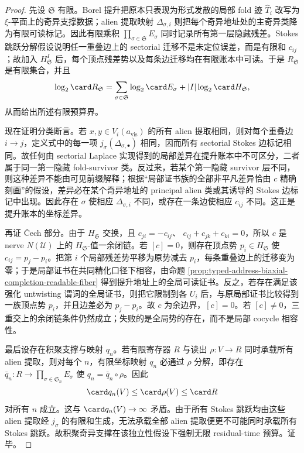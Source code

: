 \begin{proof}
先设 \(\mathfrak S\) 有限。Borel 提升把原本只表现为形式发散的局部 fold 迹
\(\widehat T_i\) 改写为 \(\xi\)-平面上的奇异支撑数据；alien 提取映射
\(\Delta_{\sigma,i}\) 则把每个奇异地址处的主奇异类降为有限可读标记。因此有限乘积
\(\prod_{\sigma\in\mathfrak S}E_{\sigma}\) 同时记录所有第一层隐藏残差。Stokes 跳跃分解假设说明任一重叠边上的 sectorial 迁移不是未定位误差，而是有限和
\(c_{ij}\)；故加入 \(H_{\mathfrak S}^{I}\) 后，每个顶点残差势以及每条边迁移均在有限账本中可读。于是
\(R_{\mathfrak S}\) 是有限集合，并且
\[
\log_2\card R_{\mathfrak S}
=\sum_{\sigma\in\mathfrak S}\log_2\card E_{\sigma}+|I|\log_2\card H_{\mathfrak S},
\]
从而给出所述有限预算界。

现在证明分类断言。若 \(x,y\in V_i(a_{\mathrm{vis}})\) 的所有 alien 提取相同，则对每个重叠边 \(i\to j\)，定义式中的每一项
\(j_{\sigma}(\Delta_{\sigma,\bullet})\) 相同，因而所有 sectorial Stokes 边标记相同。故任何由 sectorial Laplace 实现得到的局部差异在提升账本中不可区分，二者属于同一第一隐藏 fold-survivor 类。反过来，若某个第一隐藏 survivor 层不同，则这种差异不能由可见前缀解释；根据“局部证书族的全部非平凡差异恰由 \(c\) 精确刻画”的假设，差异必在某个奇异地址的 principal alien 类或其诱导的 Stokes 边标记中出现。因此存在 \(\sigma\) 使相应 \(\Delta_{\sigma,i}\) 不同，或存在一条边使相应 \(c_{ij}\) 不同。这正是提升账本的坐标差异。

再证 Čech 部分。由于 \(H_{\mathfrak S}\) 交换，且 \(c_{ji}=-c_{ij}\)、
\(c_{ij}+c_{jk}+c_{ki}=0\)，所以 \(c\) 是 nerve \(N(\mathcal U)\) 上的 \(H_{\mathfrak S}\)-值一余闭链。若
\([c]=0\)，则存在顶点势 \(p_i\in H_{\mathfrak S}\) 使
\(c_{ij}=p_j-p_i\)。把第 \(i\) 个局部残差势平移为原势减去 \(p_i\)，每条重叠边上的迁移变为零；于是局部证书在共同精化口径下相容，由命题 \ref{prop:typed-address-biaxial-completion-readable-fiber} 得到提升地址上的全局可读证书。反之，若存在满足该强化 untwisting 谓词的全局证书，则把它限制到各 \(U_i\) 后，与原局部证书比较得到一族顶点势 \(p_i\)，并且边差必为 \(p_j-p_i\)。故 \(c\) 为余边界，\([c]=0\)。若 \([c]\ne0\)，三重交上的余闭链条件仍然成立；失败的是全局势的存在，而不是局部 cocycle 相容性。

最后设存在积聚支撑与映射 \(q_n\)。若有限寄存器 \(R\) 与读出
\(\rho:V\to R\) 同时承载所有 alien 提取，则对每个 \(n\)，有限坐标映射 \(q_n\) 必通过 \(\rho\) 分解，即存在
\(\bar q_n:R\to\prod_{\sigma\in\mathfrak S_n}E_{\sigma}\) 使
\(q_n=\bar q_n\circ\rho\)。因此
\[
\card q_n(V)\le \card \rho(V)\le \card R
\]
对所有 \(n\) 成立。这与 \(\card q_n(V)\to\infty\) 矛盾。由于所有 Stokes 跳跃均由这些 alien 提取经 \(j_{\sigma}\) 的有限和生成，无法承载全部 alien 提取便更不可能同时承载所有 Stokes 跳跃。故积聚奇异支撑在该独立性假设下强制无限 residual-time 预算。证毕。
\end{proof}

